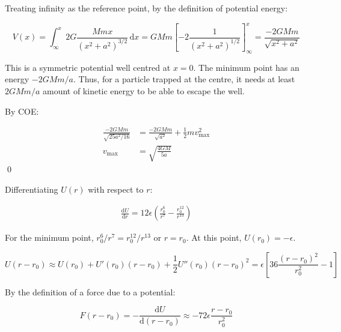\documentclass[12pt]{article}
\begin{document}
Treating infinity as the reference point, by the definition of potential energy:

\begin{equation}
    V(x) = \int_{\infty}^{x} 2 G \frac{Mmx}{(x^{2} + a^{2})^{3/2}} \, \mathrm{d}x = GMm \left[ -2 \frac{1}{(x^{2} + a^{2})^{1/2}} \right]_{\infty}^{x} = \frac{-2GMm}{\sqrt{x^{2} + a^{2}}}
\end{equation}

This is a symmetric potential well centred at $x = 0$. The minimum point has an energy $-2GMm/a$. Thus, for a particle trapped at the centre, it needs at least $2GMm/a$ amount of kinetic energy to be able to escape the well.

By COE:

\begin{equation}
\begin{split}
    \frac{-2GMm}{\sqrt{25a^{2}/16}} &= \frac{-2GMm}{\sqrt{a^{2}}} + \frac{1}{2} m v_{\text{max}}^{2} \\
    v_{\text{max}} &= \sqrt{\frac{4GM}{5a}}
\end{split}
\end{equation}
\qed



Differentiating $U(r)$ with respect to $r$:

\begin{equation}
\begin{split}
    \frac{\mathrm{d}U}{\mathrm{d}r} = 12\epsilon \left( \frac{r_{0}^{6}}{r^{7}} - \frac{r_{0}^{12}}{r^{13}} \right)
\end{split}
\end{equation}

For the minimum point, $r_{0}^{6}/r^{7} = r_{0}^{12}/r^{13}$ or $r = r_{0}$. At this point, $U(r_{0}) = -\epsilon$.


\begin{equation}
    U(r - r_{0}) \approx U(r_{0}) + U'(r_{0}) (r - r_{0}) + \frac{1}{2} U''(r_{0}) (r - r_{0})^{2} = \epsilon \left[ 36\frac{(r - r_{0})^{2}}{r_{0}^{2}} - 1 \right]
\end{equation}

By the definition of a force due to a potential:

\begin{equation}
    F(r - r_{0}) = -\frac{\mathrm{d}U}{\mathrm{d}(r - r_{0})} \approx -72 \epsilon \frac{r - r_{0}}{r_{0}^{2}}
\end{equation}
\end{document}
